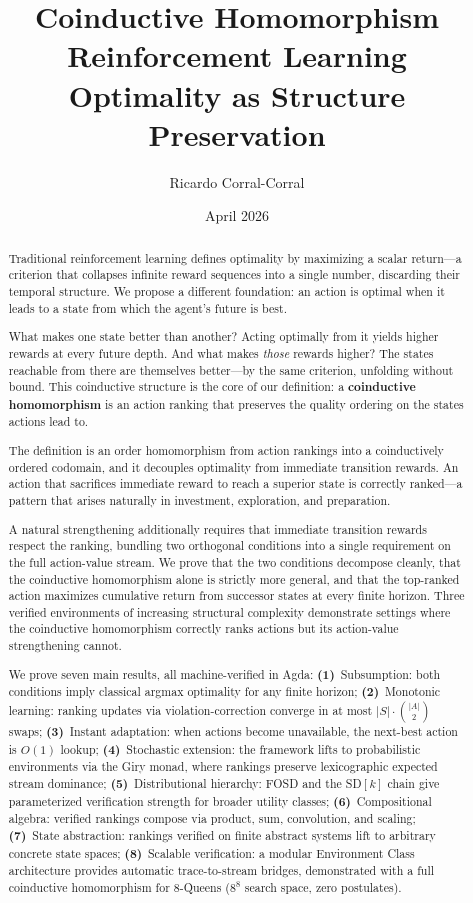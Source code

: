 \documentclass[9pt,a4paper]{article}
\title{\textbf{Coinductive Homomorphism Reinforcement Learning} \\
Optimality as Structure Preservation}
\author{Ricardo Corral-Corral}
\date{April 2026}
\theoremstyle{plain}
\theoremstyle{definition}
\theoremstyle{remark}
\begin{document}
\maketitle

\begin{abstract}
Traditional reinforcement learning defines optimality by maximizing a scalar return---a criterion that collapses infinite reward sequences into a single number, discarding their temporal structure.
We propose a different foundation: an action is optimal when it leads to a state from which the agent's future is best.

What makes one state better than another?
Acting optimally from it yields higher rewards at every future depth.
And what makes \emph{those} rewards higher?
The states reachable from there are themselves better---by the same criterion, unfolding without bound.
This coinductive structure is the core of our definition: a \textbf{coinductive homomorphism} is an action ranking that preserves the quality ordering on the states actions lead to.

The definition is an order homomorphism from action rankings into a coinductively ordered codomain, and it decouples optimality from immediate transition rewards.
An action that sacrifices immediate reward to reach a superior state is correctly ranked---a pattern that arises naturally in investment, exploration, and preparation.

A natural strengthening additionally requires that immediate transition rewards respect the ranking, bundling two orthogonal conditions into a single requirement on the full action-value stream.
We prove that the two conditions decompose cleanly, that the coinductive homomorphism alone is strictly more general, and that the top-ranked action maximizes cumulative return from successor states at every finite horizon.
Three verified environments of increasing structural complexity demonstrate settings where the coinductive homomorphism correctly ranks actions but its action-value strengthening cannot.

We prove seven main results, all machine-verified in Agda:
\textbf{(1)}~Subsumption: both conditions imply classical argmax optimality for any finite horizon;
\textbf{(2)}~Monotonic learning: ranking updates via violation-correction converge in at most $|S| \cdot \binom{|A|}{2}$ swaps;
\textbf{(3)}~Instant adaptation: when actions become unavailable, the next-best action is $O(1)$ lookup;
\textbf{(4)}~Stochastic extension: the framework lifts to probabilistic environments via the Giry monad, where rankings preserve lexicographic expected stream dominance;
\textbf{(5)}~Distributional hierarchy: FOSD and the SD$[k]$ chain give parameterized verification strength for broader utility classes;
\textbf{(6)}~Compositional algebra: verified rankings compose via product, sum, convolution, and scaling;
\textbf{(7)}~State abstraction: rankings verified on finite abstract systems lift to arbitrary concrete state spaces;
\textbf{(8)}~Scalable verification: a modular Environment Class architecture provides automatic trace-to-stream bridges, demonstrated with a full coinductive homomorphism for $8$-Queens ($8^8$ search space, zero postulates).


\end{abstract}
\end{document}
